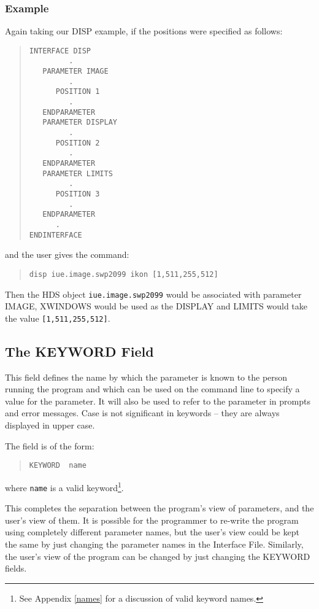\documentclass[twoside,11pt]{article}
\newcommand{\xlabel}[1]{}
\renewcommand{\_}{\texttt{\symbol{95}}}
\begin{document}
\subsubsection*{Example}
Again taking our DISP example, if the positions were specified as follows:
\begin{quote} \begin{verbatim}
INTERFACE DISP
         .
   PARAMETER IMAGE
         .
      POSITION 1
         .
   ENDPARAMETER
   PARAMETER DISPLAY
         .
      POSITION 2
         .
   ENDPARAMETER
   PARAMETER LIMITS
         .
      POSITION 3
         .
   ENDPARAMETER   
      .
ENDINTERFACE
\end{verbatim} \end{quote}
and the user gives the command:
\begin{quote} \begin{verbatim}
disp iue.image.swp2099 ikon [1,511,255,512]
\end{verbatim} \end{quote}
Then the HDS object \texttt{iue.image.swp2099} would be associated with parameter
IMAGE, XWINDOWS would be used as the DISPLAY and LIMITS would take the value
\texttt{[1,511,255,512]}.

\subsection{The KEYWORD Field\xlabel{the_keyword_field}}

This field defines the name by which the parameter is known to 
the person running the program and which can be used on the command line to 
specify a value for the parameter. It will also be used to refer to the
parameter in prompts and error messages. Case is not significant in keywords --
they are always displayed in upper case.

The field is of the form:
\begin{quote} \begin{verbatim}
KEYWORD  name
\end{verbatim} \end{quote}
where \texttt{name} is a valid keyword\footnote{See Appendix \ref{names} for a
discussion of valid keyword names.}.

This completes the separation between the program's
view of parameters, and the user's view of them. It is possible for the
programmer to re-write the program using completely different parameter
names, but the user's view could be kept the same by just changing the 
parameter names in the Interface File. Similarly, the
user's view of the program can be changed by just changing the
KEYWORD fields.
\end{document}
